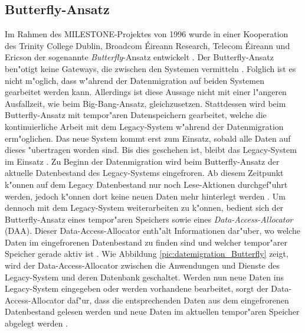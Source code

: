 \subsection{Butterfly-Ansatz}



Im Rahmen des MILESTONE-Projektes von 1996 wurde in einer Kooperation des Trinity College Dublin, Broadcom \'{E}ireann Research, Telecom \'{E}ireann und Ericson der sogenannte \textit{Butterfly}-Ansatz entwickelt \citep[S.~202]{wuLawlessBisbal-1997}. Der Butterfly-Ansatz ben"otigt keine Gateways, die zwischen den Systemen vermitteln \citep[S.~202]{wuLawlessBisbal-1997}. Folglich ist es nicht m"oglich, dass w"ahrend der Datenmigration auf beiden Systemen gearbeitet werden kann. Allerdings ist diese Aussage nicht mit einer l"angeren Ausfallzeit, wie beim Big-Bang-Ansatz, gleichzusetzen. Stattdessen wird beim Butterfly-Ansatz mit tempor"aren Datenspeichern gearbeitet, welche die kontinuierliche Arbeit mit dem Legacy-System w"ahrend der Datenmigration erm"oglichen. Das neue System kommt erst zum Einsatz, sobald alle Daten auf dieses "ubertragen worden sind. Bis dies geschehen ist, bleibt das Legacy-System im Einsatz \citep[S.~3]{wuLawless-1997}.
\lb
Zu Beginn der Datenmigration wird beim Butterfly-Ansatz der aktuelle Datenbestand des Legacy-Systems eingefroren. Ab diesem Zeitpunkt k"onnen auf dem Legacy Datenbestand nur noch Lese-Aktionen durchgef"uhrt werden, jedoch k"onnen dort keine neuen Daten mehr hinterlegt werden \citep[S.~202]{wuLawlessBisbal-1997}. Um dennoch mit dem Legacy-System weiterarbeiten zu k"onnen, bedient sich der Butterfly-Ansatz eines tempor"aren Speichers sowie eines \textit{Data-Access-Allocator} (DAA). Dieser Data-Access-Allocator enth"alt Informationen dar"uber, wo welche Daten im eingefrorenen Datenbestand zu finden sind und welcher tempor"arer Speicher gerade aktiv ist \citep[S.~202]{wuLawlessBisbal-1997}. Wie Abbildung \ref{pic:datemigration_Butterfly} zeigt, wird der Data-Access-Allocator zwischen die Anwendungen und Dienste des Legacy-System und deren Datenbank geschaltet. Werden nun neue Daten ins Legacy-System eingegeben oder werden vorhandene bearbeitet, sorgt der Data-Access-Allocator daf"ur, dass die entsprechenden Daten aus dem eingefrorenen Datenbestand gelesen werden und neue Daten im aktuellen tempor"aren Speicher abgelegt werden \citep[S.~202]{wuLawlessBisbal-1997}.
\lb


